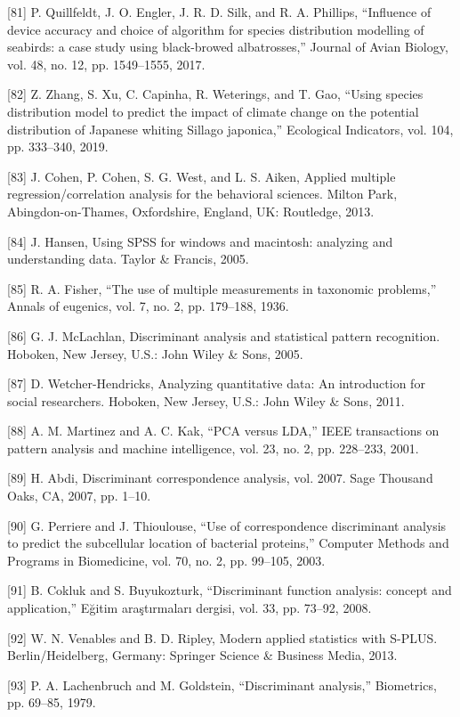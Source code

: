 \documentclass[sn-mathphys-num]{sn-jnl}%
\begin{document}
[81] P. Quillfeldt, J. O. Engler, J. R. D. Silk, and R. A. Phillips, “Influence of device accuracy and choice of algorithm for species distribution modelling of seabirds: a case study using black-browed albatrosses,” Journal of Avian Biology, vol. 48, no. 12, pp. 1549–1555, 2017.

[82] Z. Zhang, S. Xu, C. Capinha, R. Weterings, and T. Gao, “Using species distribution model to predict the impact of climate change on the potential distribution of Japanese whiting Sillago japonica,” Ecological Indicators, vol. 104, pp. 333–340, 2019.

[83] J. Cohen, P. Cohen, S. G. West, and L. S. Aiken, Applied multiple regression/correlation analysis for the behavioral sciences. Milton Park, Abingdon-on-Thames, Oxfordshire, England, UK: Routledge, 2013.

[84] J. Hansen, Using SPSS for windows and macintosh: analyzing and understanding data. Taylor & Francis, 2005.

[85] R. A. Fisher, “The use of multiple measurements in taxonomic problems,” Annals of eugenics, vol. 7, no. 2, pp. 179–188, 1936.

[86] G. J. McLachlan, Discriminant analysis and statistical pattern recognition. Hoboken, New Jersey, U.S.: John Wiley & Sons, 2005.

[87] D. Wetcher-Hendricks, Analyzing quantitative data: An introduction for social researchers. Hoboken, New Jersey, U.S.: John Wiley & Sons, 2011.

[88] A. M. Martinez and A. C. Kak, “PCA versus LDA,” IEEE transactions on pattern analysis and machine intelligence, vol. 23, no. 2, pp. 228–233, 2001.

[89] H. Abdi, Discriminant correspondence analysis, vol. 2007. Sage Thousand Oaks, CA, 2007, pp. 1–10.

[90] G. Perriere and J. Thioulouse, “Use of correspondence discriminant analysis to predict the subcellular location of bacterial proteins,” Computer Methods and Programs in Biomedicine, vol. 70, no. 2, pp. 99–105, 2003.

[91] B. Cokluk and S. Buyukozturk, “Discriminant function analysis: concept and application,” Eğitim araştırmaları dergisi, vol. 33, pp. 73–92, 2008.

[92] W. N. Venables and B. D. Ripley, Modern applied statistics with S-PLUS. Berlin/Heidelberg, Germany: Springer Science & Business Media, 2013.

[93] P. A. Lachenbruch and M. Goldstein, “Discriminant analysis,” Biometrics, pp. 69–85, 1979.
\end{document}
